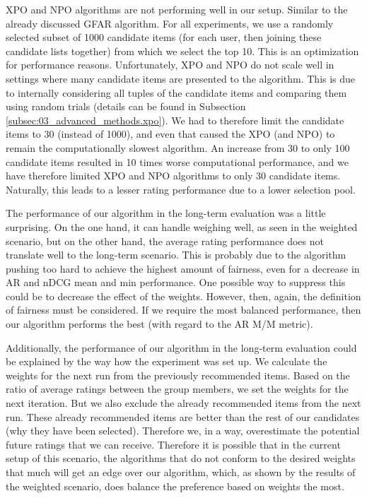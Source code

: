 XPO and NPO algorithms are not performing well in our setup. Similar to the already discussed GFAR algorithm. For all experiments, we use a randomly selected subset of 1000 candidate items (for each user, then joining these candidate lists together) from which we select the top 10. This is an optimization for performance reasons. Unfortunately, XPO and NPO do not scale well in settings where many candidate items are presented to the algorithm. This is due to internally considering all tuples of the candidate items and comparing them using random trials (details can be found in Subsection \ref{subsec:03_advanced_methods.xpo}). We had to therefore limit the candidate items to 30 (instead of 1000), and even that caused the XPO (and NPO) to remain the computationally slowest algorithm. An increase from 30 to only 100 candidate items resulted in 10 times worse computational performance, and we have therefore limited XPO and NPO algorithms to only 30 candidate items. Naturally, this leads to a lesser rating performance due to a lower selection pool.

The performance of our algorithm in the long-term evaluation was a little surprising. On the one hand, it can handle weighing well, as seen in the weighted scenario, but on the other hand, the average rating performance does not translate well to the long-term scenario. This is probably due to the algorithm pushing too hard to achieve the highest amount of fairness, even for a decrease in AR and nDCG mean and min performance. One possible way to suppress this could be to decrease the effect of the weights. However, then, again, the definition of fairness must be considered. If we require the most balanced performance, then our algorithm performs the best (with regard to the AR M/M metric).

Additionally, the performance of our algorithm in the long-term evaluation could be explained by the way how the experiment was set up. We calculate the weights for the next run from the previously recommended items. Based on the ratio of average ratings between the group members, we set the weights for the next iteration. But we also exclude the already recommended items from the next run. These already recommended items are better than the rest of our candidates (why they have been selected). Therefore we, in a way, overestimate the potential future ratings that we can receive. Therefore it is possible that in the current setup of this scenario, the algorithms that do not conform to the desired weights that much will get an edge over our algorithm, which, as shown by the results of the weighted scenario, does balance the preference based on weights the most.

